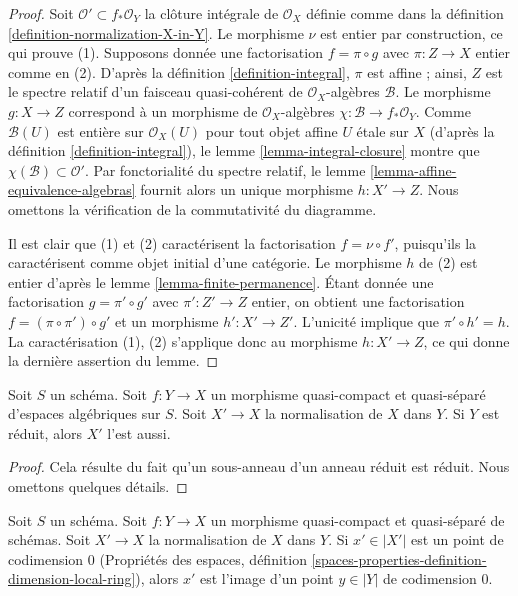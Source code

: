 \begin{proof}
Soit $\mathcal{O}' \subset f_*\mathcal{O}_Y$ la clôture intégrale de
$\mathcal{O}_X$ définie comme dans la définition \ref{definition-normalization-X-in-Y}.
Le morphisme $\nu$ est entier par construction, ce qui prouve (1).
Supposons donnée une factorisation $f = \pi \circ g$ avec $\pi : Z \to X$
entier comme en (2). D'après la définition \ref{definition-integral},
$\pi$ est affine ; ainsi, $Z$ est le spectre relatif
d'un faisceau quasi-cohérent de $\mathcal{O}_X$-algèbres $\mathcal{B}$.
Le morphisme $g : X \to Z$ correspond à un morphisme de $\mathcal{O}_X$-algèbres
$\chi : \mathcal{B} \to f_*\mathcal{O}_Y$. Comme $\mathcal{B}(U)$ est
entière sur $\mathcal{O}_X(U)$ pour tout objet affine $U$ étale sur $X$
(d'après la définition \ref{definition-integral}),
le lemme \ref{lemma-integral-closure} montre
que $\chi(\mathcal{B}) \subset \mathcal{O}'$.
Par fonctorialité du spectre relatif,
le lemme \ref{lemma-affine-equivalence-algebras}
fournit alors un unique morphisme
$h : X' \to Z$. Nous omettons la vérification de la commutativité du diagramme.

\medskip\noindent
Il est clair que (1) et (2) caractérisent la
factorisation $f = \nu \circ f'$, puisqu'ils la caractérisent
comme objet initial d'une catégorie. Le morphisme $h$ de (2)
est entier d'après le lemme \ref{lemma-finite-permanence}.
Étant donnée une factorisation $g = \pi' \circ g'$ avec $\pi' : Z' \to Z$
entier, on obtient une factorisation $f = (\pi \circ \pi') \circ g'$ et
un morphisme $h' : X' \to Z'$. L'unicité implique que
$\pi' \circ h' = h$. La caractérisation (1), (2) s'applique donc
au morphisme $h : X' \to Z$, ce qui donne la dernière assertion du lemme.
\end{proof}

\begin{lemma}
\label{lemma-normalization-in-reduced}
Soit $S$ un schéma. Soit $f : Y \to X$ un morphisme quasi-compact et
quasi-séparé d'espaces algébriques sur $S$.
Soit $X' \to X$ la normalisation de $X$ dans $Y$.
Si $Y$ est réduit, alors $X'$ l'est aussi.
\end{lemma}

\begin{proof}
Cela résulte du fait qu'un sous-anneau d'un anneau réduit est réduit.
Nous omettons quelques détails.
\end{proof}

\begin{lemma}
\label{lemma-normalization-generic}
Soit $S$ un schéma. Soit $f : Y \to X$ un morphisme quasi-compact et quasi-séparé
de schémas. Soit $X' \to X$ la normalisation de $X$ dans $Y$.
Si $x' \in |X'|$ est un point de codimension $0$
(Propriétés des espaces, définition
\ref{spaces-properties-definition-dimension-local-ring}), alors
$x'$ est l'image d'un point $y \in |Y|$ de codimension $0$.
\end{lemma}

